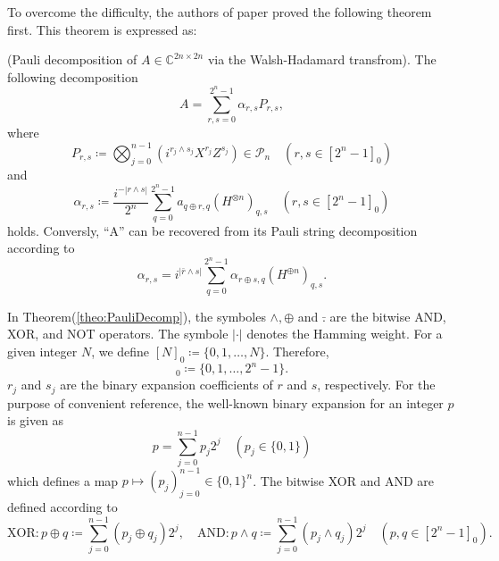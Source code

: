 To overcome the difficulty, the authors of paper \cite{Georges_2025} proved the following theorem first. This theorem is expressed as:
\begin{theorem}
    (Pauli decomposition of $A\in\mathbb{C}^{2n\times2n}$ via the Walsh-Hadamard transfrom). The following decomposition
    \begin{equation}
        A=\sum_{r,s=0}^{2^n-1}\alpha_{r,s}P_{r,s},
    \end{equation}
    where
    \begin{equation}
        P_{r,s}\coloneqq\bigotimes_{j=0}^{n-1}(i^{r_j\wedge s_j}X^{r_j}Z^{s_j})\in\mathscr{P}_n\quad(r,s\in[2^n-1]_0)
    \end{equation}
    and
    \begin{equation}
        \alpha_{r,s}\coloneqq\frac{i^{-|r\wedge s|}}{2^n}\sum_{q=0}^{2^n-1}a_{q\oplus r,q}{(H^{\otimes n})_{q,s}}\quad(r,s\in[2^n-1]_0)
    \end{equation}
    holds. Conversly, ``A'' can be recovered from its Pauli string decomposition according to 
    \begin{equation}
        \alpha_{r,s}=i^{|\bar{r}\wedge s|}\sum_{q=0}^{2^n-1}\alpha_{r\oplus s, q}(H^{\oplus n})_{q,s}.
    \end{equation}
    \label{theo:PauliDecomp}
\end{theorem}
In Theorem(\ref{theo:PauliDecomp}), the symboles $\wedge, \oplus$ and $\bar{.}$ are the bitwise AND, XOR, and NOT operators. The symbole $|\cdot|$ denotes the Hamming weight.  For a given integer $N$, we define $[N]_0\coloneqq\{0,1,\dots,N\}$. Therefore, 
\begin{equation}
    [2^n-1]_0\coloneqq\{0,1,\dots,2^n-1\}.
    \label{eqn:numSet}
\end{equation} 
$r_j$ and $s_j$ are the binary expansion coefficients of $r$ and $s$, respectively. For the purpose of convenient reference, the well-known binary expansion for an integer $p$ is given as
\begin{equation}
    p=\sum_{j=0}^{n-1}p_j 2^j \quad (p_j\in\{0,1\})
\end{equation}
which defines a map $p\mapsto(p_j)_{j=0}^{n-1}\in\{0,1\}^n$. The bitwise XOR and AND are defined according to
\begin{equation}
    \text{XOR}: p\oplus q\coloneqq\sum_{j=0}^{n-1}(p_j\oplus q_j)2^j, \quad \text{AND}:p\wedge q\coloneqq\sum_{j=0}^{n-1}(p_j\wedge q_j)2^j\quad(p,q\in[2^n-1]_0).
    \label{eqn:bitwiseOperator}
\end{equation}
